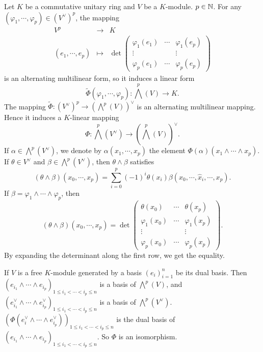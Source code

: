 Let $K$ be a commutative unitary ring and $V$ be a $K$-module.
$p \in \mathbb{N}$.
For any $(\varphi_1,\cdots,\varphi_p) \in (V^\vee)^p$,
the mapping
$$\begin{array}{rcl}
    V^p & \longrightarrow & K\\
    (e_1,\cdots,e_p) & \longmapsto & \det \begin{pmatrix}
        \varphi_1(e_1) & \cdots & \varphi_1(e_p)\\
        \vdots & & \vdots\\
        \varphi_p(e_1) & \cdots & \varphi_p(e_p)
    \end{pmatrix}
\end{array}$$
is an alternating multilinear form,
so it induces a linear form
$$\tilde{\Phi} (\varphi_1,\cdots,\varphi_p) : \bigwedge^p (V) \longrightarrow K.$$
The mapping $\tilde{\Phi}: (V^\vee)^p \longrightarrow (\bigwedge^p (V))^\vee$ is an alternating multilinear mapping.
Hence it induces a $K$-linear mapping
$$\Phi : \bigwedge^p (V^\vee) \longrightarrow (\bigwedge^p (V))^\vee.$$
If $\alpha \in \bigwedge^p(V^\vee)$, we denote by $\alpha (x_1,\cdots,x_p)$ the element $\Phi(\alpha)(x_1 \wedge \cdots \wedge x_p)$.
If $\theta \in V^\vee$ and $\beta \in \bigwedge^p (V^\vee)$, then $\theta \wedge \beta$ satisfies
$$(\theta \wedge \beta) (x_0,\cdots,x_p) = \sum_{i=0}^{p}(-1)^i \theta(x_i)\beta(x_0,\cdots,\hat{x}_i,\cdots,x_p).$$
If $\beta = \varphi_1 \wedge \cdots \wedge \varphi_p$, then
$$(\theta \wedge \beta) (x_0,\cdots,x_p) = \det \begin{pmatrix}
        \theta(x_0) & \cdots & \theta(x_p)\\
        \varphi_1(x_0) & \cdots & \varphi_1(x_p)\\
        \vdots & & \vdots\\
        \varphi_p(x_0) & \cdots & \varphi_p(x_p)
    \end{pmatrix}.$$
By expanding the determinant along the first row, we get the equality.

\begin{remark}
    If $V$ is a free $K$-module generated by a basis $(e_i)_{i=1}^{n}$ be its dual basis.
    Then $(e_{i_1} \wedge \cdots \wedge e_{i_p})_{1\le i_1 < \cdots < i_p \le n}$ is a basis of $\bigwedge^p (V)$,
    and $(e_{i_1}^\vee \wedge \cdots \wedge e_{i_p}^\vee)_{1\le i_1 < \cdots < i_p \le n}$ is a basis of $\bigwedge^p (V^\vee)$.
    $(\Phi(e_i^\vee \wedge \cdots \wedge e_{i_p}^\vee))_{1\le i_1 < \cdots < i_p \le n}$ is the dual basis of $(e_{i_1} \wedge \cdots \wedge e_{i_p})_{1\le i_1 < \cdots < i_p \le n}$.
    So $\Phi$ is an isomorphism.
\end{remark}    

